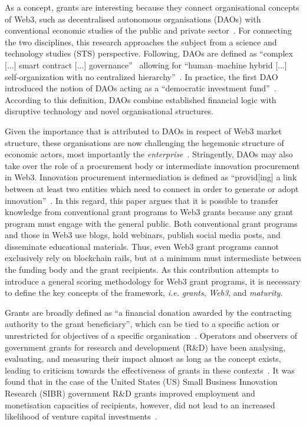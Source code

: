 \documentclass[conference]{IEEEtran}
\begin{document}
As a concept, grants are interesting because they connect organisational concepts of Web3, such as decentralised autonomous organisations (DAOs) with conventional economic studies of the public and private sector~\cite{ding_desci_2022,monteiro_decentralised_2023,wang_self-sovereign_2020}. For connecting the two disciplines, this research approaches the subject from a science and technology studies (STS) perspective. Following, DAOs are defined as “complex [...] smart contract [...] governance”~\cite[p.~501]{shermin_disrupting_2017} allowing for “human–machine hybrid [...] self-organization with no centralized hierarchy”~\cite[p.~1564]{ding_desci_2022}. In practice, the first DAO introduced the notion of DAOs acting as a “democratic investment fund”~\cite[p.~4]{santos_dao_2018}. According to this definition, DAOs combine established financial logic with disruptive technology and novel organisational structures. 

Given the importance that is attributed to DAOs in respect of Web3 market structure, these organisations are now challenging the hegemonic structure of economic actors, most importantly the \textit{enterprise}~\cite{wang_novel_2024}. Stringently, DAOs may also take over the role of a procurement body or intermediate innovation procurement in Web3. Innovation procurement intermediation is defined as “provid[ing] a link between at least two entities which need to connect in order to generate or adopt innovation”~\cite[p.~416]{edler_connecting_2016}. In this regard, this paper argues that it is possible to transfer knowledge from conventional grant programs to Web3 grants because any grant program must engage with the general public. Both conventional grant programs and those in Web3 use blogs, hold webinars, publish social media posts, and disseminate educational materials. Thus, even Web3 grant programs cannot exclusively rely on blockchain rails, but at a minimum must intermediate between the funding body and the grant recipients. As this contribution attempts to introduce a general scoring methodology for Web3 grant programs, it is necessary to define the key concepts of the framework, \textit{i.e.} \textit{grants}, \textit{Web3}, and \textit{maturity}.

Grants are broadly defined as ``a financial donation awarded by the contracting authority to the grant beneficiary'', which can be tied to a specific action or unrestricted for objectives of a specific organisation~\cite{european_commission_grants_2023}. Operators and observers of government grants for research and development (R\&D) have been analysing, evaluating, and measuring their impact almost as long as the concept exists, leading to criticism towards the effectiveness of grants in these contexts~\cite{howell_financing_2017,lerner_government_2000}. It was found that in the case of the United States (US) Small Business Innovation Research (SIBR) government R\&D grants improved employment and monetisation capacities of recipients, however, did not lead to an increased likelihood of venture capital investments~\cite{lerner_government_2000}.
\end{document}
